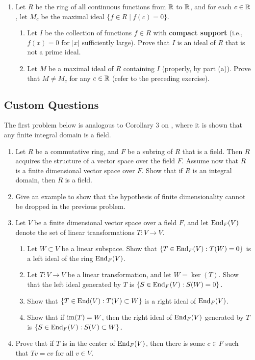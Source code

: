\documentclass[../psets.tex]{subfiles}
\begin{document}
\begin{enumerate}[resume]
    \item Let $R$ be the ring of all continuous functions from $\mathbb{R}$ to $\mathbb{R}$, and for each $c\in\mathbb{R}$, let $M_c$ be the maximal ideal $\{f\in R\mid f(c)=0\}$.
    \begin{enumerate}[label={\textbf{(\alph*)}}]
        \item Let $I$ be the collection of functions $f\in R$ with \textbf{compact support} (i.e., $f(x)=0$ for $|x|$ sufficiently large). Prove that $I$ is an ideal of $R$ that is not a prime ideal.
        \item Let $M$ be a maximal ideal of $R$ containing $I$ (properly, by part (a)). Prove that $M\neq M_c$ for any $c\in\mathbb{R}$ (refer to the preceding exercise).
    \end{enumerate}
\end{enumerate}


\subsection*{Custom Questions}
The first problem below is analogous to Corollary 3 on \textcite[228]{bib:DummitFoote}, where it is shown that any finite integral domain is a field.
\begin{enumerate}[resume]
    \item Let $R$ be a commutative ring, and $F$ be a subring of $R$ that is a field. Then $R$ acquires the structure of a vector space over the field $F$. Assume now that $R$ is a finite dimensional vector space over $F$. Show that if $R$ is an integral domain, then $R$ is a field.
    \item Give an example to show that the hypothesis of finite dimensionality cannot be dropped in the previous problem.
    \item Let $V$ be a finite dimensional vector space over a field $F$, and let $\operatorname{End}_F(V)$ denote the set of linear transformations $T:V\to V$.
    \begin{enumerate}[label={(\alph*)}]
        \item Let $W\subset V$ be a linear subspace. Show that $\{T\in\operatorname{End}_F(V):T(W)=0\}$ is a left ideal of the ring $\operatorname{End}_F(V)$.
        \item Let $T:V\to V$ be a linear transformation, and let $W=\ker(T)$. Show that the left ideal generated by $T$ is $\{S\in\operatorname{End}_F(V):S(W)=0\}$.
        \item Show that $\{T\in\operatorname{End}(V):T(V)\subset W\}$ is a right ideal of $\operatorname{End}_F(V)$.
        \item Show that if $\operatorname{im}(T)=W$, then the right ideal of $\operatorname{End}_F(V)$ generated by $T$ is $\{S\in\operatorname{End}_F(V):S(V)\subset W\}$.
    \end{enumerate}
    \item Prove that if $T$ is in the center of $\operatorname{End}_F(V)$, then there is some $c\in F$ such that $Tv=cv$ for all $v\in V$.
\end{enumerate}
\end{document}
